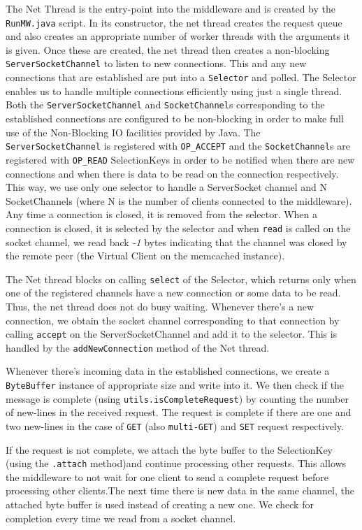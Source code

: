 \documentclass[11pt,a4paper]{article}
\begin{document}
	The Net Thread is the entry-point into the middleware and is created by the \texttt{RunMW.java} script. In its constructor, the net thread creates the request queue and also creates an appropriate number of worker threads with the arguments it is given.
Once these are created, the net thread then creates a non-blocking \texttt{ServerSocketChannel} to listen to new connections. This and any new connections that are established are put into a \texttt{Selector} and polled. The Selector enables us to handle multiple connections efficiently using just a single thread. Both the \texttt{ServerSocketChannel} and \texttt{SocketChannel}s corresponding to the established connections are configured to be non-blocking in order to make full use of the Non-Blocking IO facilities provided by Java. The \texttt{ServerSocketChannel} is registered with \texttt{OP\_ACCEPT} and the \texttt{SocketChannel}s are registered with \texttt{OP\_READ} SelectionKeys in order to be notified when there are new connections and when there is data to be read on the connection respectively.  This way, we use only one selector to handle a ServerSocket channel and N SocketChannels (where N is the number of clients connected to the middleware). Any time a connection is closed, it is removed from the selector. When a connection is closed, it is selected by the selector and when \texttt{read} is called on the socket channel, we read back \emph{-1} bytes indicating that the channel was closed by the remote peer (the Virtual Client on the memcached instance).


The Net thread blocks on calling \texttt{select} of the Selector, which returns only when one of the registered channels have a new connection or some data to be read. Thus, the net thread does not do busy waiting. Whenever there's a new connection, we obtain the socket channel corresponding to that connection by calling \texttt{accept} on the ServerSocketChannel and add it to the selector. This is handled by the \texttt{addNewConnection} method of the Net thread.


Whenever there's incoming data in the established connections, we create a \texttt{ByteBuffer} instance of appropriate size and write into it. We then check if the message is complete (using \texttt{utils.isCompleteRequest}) by counting the number of new-lines in the received request. The request is complete if there are one and two new-lines in the case of \texttt{GET} (also \texttt{multi-GET}) and \texttt{SET} request respectively.


If the request is not complete, we attach the byte buffer to the SelectionKey (using the \texttt{.attach} method)and continue processing other requests. This allows the middleware to not wait for one client to send a complete request before processing other clients.The next time there is new data in the same channel, the attached byte buffer is used instead of creating a new one. We check for completion every time we read from a socket channel.
\end{document}
